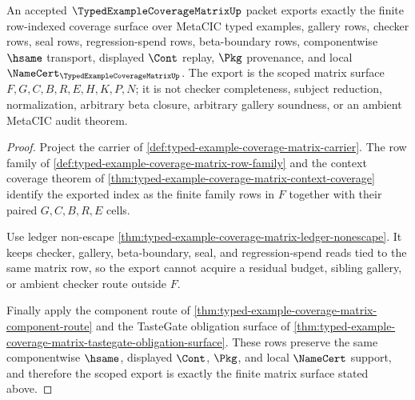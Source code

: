 \begin{theorem}
\label{thm:typed-example-coverage-matrix-scoped-export}
An accepted $\TypedExampleCoverageMatrixUp$ packet exports exactly the finite row-indexed coverage surface over MetaCIC typed examples, gallery rows, checker rows, seal rows, regression-spend rows, beta-boundary rows, componentwise $\hsame$ transport, displayed $\Cont$ replay, $\Pkg$ provenance, and local $\NameCert_{\TypedExampleCoverageMatrixUp}$. The export is the scoped matrix surface $F,G,C,B,R,E,H,K,P,N$; it is not checker completeness, subject reduction, normalization, arbitrary beta closure, arbitrary gallery soundness, or an ambient MetaCIC audit theorem.
\end{theorem}
\begin{proof}
Project the carrier of \autoref{def:typed-example-coverage-matrix-carrier}. The row family of \autoref{def:typed-example-coverage-matrix-row-family} and the context coverage theorem of \autoref{thm:typed-example-coverage-matrix-context-coverage} identify the exported index as the finite family rows in $F$ together with their paired $G,C,B,R,E$ cells.

Use ledger non-escape \autoref{thm:typed-example-coverage-matrix-ledger-nonescape}. It keeps checker, gallery, beta-boundary, seal, and regression-spend reads tied to the same matrix row, so the export cannot acquire a residual budget, sibling gallery, or ambient checker route outside $F$.

Finally apply the component route of \autoref{thm:typed-example-coverage-matrix-component-route} and the TasteGate obligation surface of \autoref{thm:typed-example-coverage-matrix-tastegate-obligation-surface}. These rows preserve the same componentwise $\hsame$, displayed $\Cont$, $\Pkg$, and local $\NameCert$ support, and therefore the scoped export is exactly the finite matrix surface stated above.
\end{proof}


